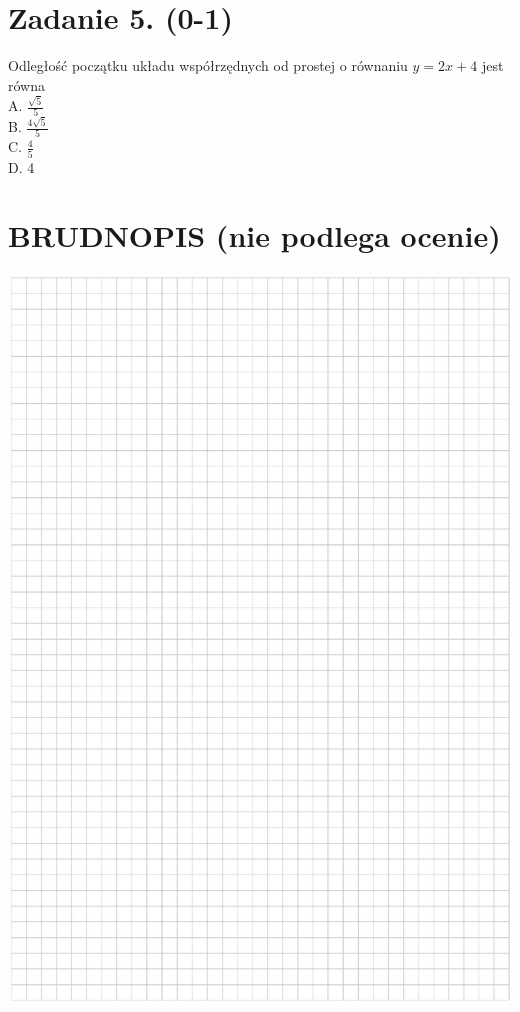 \documentclass[10pt]{article}
\begin{document}
\section*{Zadanie 5. (0-1)}
Odległość początku układu współrzędnych od prostej o równaniu \(y=2 x+4\) jest równa\\
A. \(\frac{\sqrt{5}}{5}\)\\
B. \(\frac{4 \sqrt{5}}{5}\)\\
C. \(\frac{4}{5}\)\\
D. 4

\section*{BRUDNOPIS (nie podlega ocenie)}
\begin{center}
\includegraphics[max width=\textwidth]{2024_11_21_838c0cfd77f195c20440g-03}
\end{center}
\end{document}

